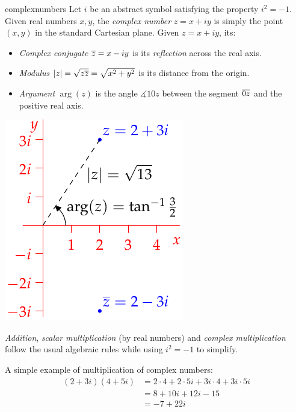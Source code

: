 \begin{defn}[lower separated=false, sidebyside, sidebyside align=top seam, sidebyside gap=0pt, righthand width=0.32\linewidth]{}{complexnumbers}
	Let $i$ be an abstract symbol satisfying the property $i^2=-1$.\smallbreak
	Given real numbers $x,y$, the \emph{complex number} $z=x+iy$ is simply the point $(x,y)$ in the standard Cartesian plane.\footnotemark\smallbreak
	Given $z=x+iy$, its:\vspace{-5pt}
	\begin{itemize}\itemsep0pt
	  \item \emph{Complex conjugate} $\overline{z}=x-iy$ is its \emph{reflection} across the real axis.
	  \item \emph{Modulus} $\left| z\right|=\sqrt{z\overline{z}}=\sqrt{x^2+y^2}$ is its distance from the origin.
	  \item \emph{Argument} $\arg(z)$ is the angle $\measuredangle 10z$ between the segment $\overline{0z}$ and the positive real axis. 
	\end{itemize}
	\tcblower
	\flushright\includegraphics[scale=0.9]{complex-argand}
\end{defn}


\emph{Addition}, \emph{scalar multiplication} (by real numbers) and \emph{complex multiplication} follow the usual algebraic rules while using $i^2=-1$ to simplify.

\begin{example}{}{}
	A simple example of multiplication of complex numbers:
	\begin{align*}
		(2+3i)(4+5i)&=2\cdot 4+2\cdot 5i+3i\cdot 4+3i\cdot 5i\tag{multiply out}\\
		&=8+10i+12i-15 \tag{use $i^2=-1$ to simplify}\\
		&=-7+22i
	\end{align*}
\end{example}

